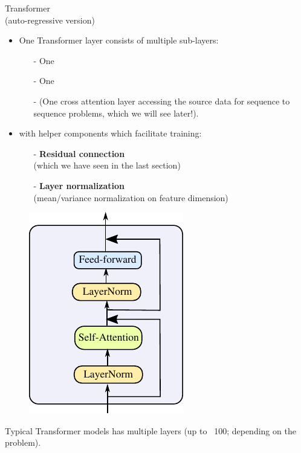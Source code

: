 \begin{frame}{Transformer\\
(auto-regressive version)}
\vsp
\begin{minipage}{0.6\linewidth}
\begin{itemize}
\item One Transformer layer  consists of multiple sub-layers:
\begin{itemize}
\item[-] One 
\item[-] One 
\item[-] (One cross attention layer accessing the source data for sequence to sequence problems, which we will see later!).
\end{itemize}
\vsp
\item with helper components which facilitate training:
\begin{itemize}
\item[-] \textbf{Residual connection} \\(which we have seen in the last section)
\item[-] \textbf{Layer normalization} \\(mean/variance normalization on feature dimension)
\end{itemize}
\end{itemize}
\vspace{3mm}

\end{minipage}
\begin{minipage}{0.35\linewidth}
\begin{figure}
\centering
\includegraphics[width=.8\linewidth]{./figures/trafo_only.pdf}
\end{figure}
\end{minipage}
\vspace{5mm}
{\small Typical Transformer models has multiple layers (up to ~100; depending on the problem).}
\end{frame}

